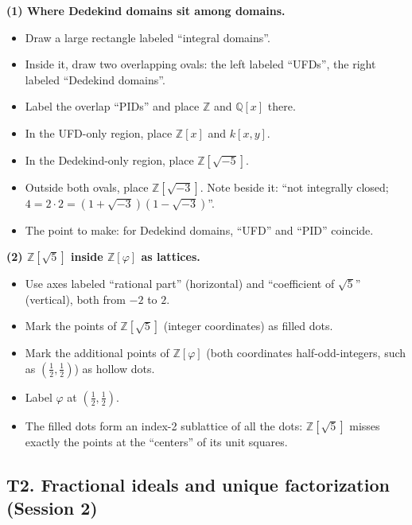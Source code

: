 \documentclass[11pt]{article}
\newcommand{\Z}{\mathbb{Z}}
\newcommand{\Q}{\mathbb{Q}}
\begin{document}
\begin{instructornote}
\textbf{(1) Where Dedekind domains sit among domains.}
\begin{itemize}
  \item Draw a large rectangle labeled ``integral domains''.
  \item Inside it, draw two overlapping ovals: the left labeled ``UFDs'', the right labeled ``Dedekind domains''.
  \item Label the overlap ``PIDs'' and place $\Z$ and $\Q[x]$ there.
  \item In the UFD-only region, place $\Z[x]$ and $k[x,y]$.
  \item In the Dedekind-only region, place $\Z[\sqrt{-5}]$.
  \item Outside both ovals, place $\Z[\sqrt{-3}]$. Note beside it: ``not integrally closed; $4=2\cdot2=(1+\sqrt{-3})(1-\sqrt{-3})$''.
  \item The point to make: for Dedekind domains, ``UFD'' and ``PID'' coincide.
\end{itemize}

\textbf{(2) $\Z[\sqrt5]$ inside $\Z[\varphi]$ as lattices.}
\begin{itemize}
  \item Use axes labeled ``rational part'' (horizontal) and ``coefficient of $\sqrt5$'' (vertical), both from $-2$ to $2$.
  \item Mark the points of $\Z[\sqrt5]$ (integer coordinates) as filled dots.
  \item Mark the additional points of $\Z[\varphi]$ (both coordinates half-odd-integers, such as $(\tfrac12,\tfrac12)$) as hollow dots.
  \item Label $\varphi$ at $(\tfrac12,\tfrac12)$.
  \item The filled dots form an index-2 sublattice of all the dots: $\Z[\sqrt5]$ misses exactly the points at the ``centers'' of its unit squares.
\end{itemize}
\end{instructornote}

\subsection{T2. Fractional ideals and unique factorization (Session 2)}
\end{document}
